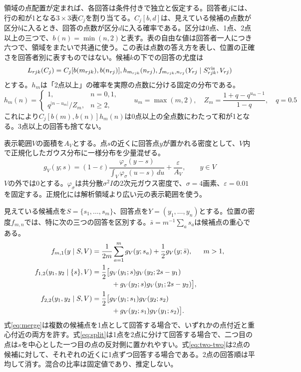 \documentclass[a4paper,11pt]{article}
\begin{document}
領域の点配置が定まれば、各回答は条件付きで独立と仮定する。回答者$j$には、行の和が1となる$3\times3$表$C_j$を割り当てる。$C_j[b,d]$は、見えている候補の点数が区分$b$に入るとき、回答の点数が区分$d$に入る確率である。区分は0点、1点、2点以上の三つで、$b(n)=\min(n,2)$と表す。表の自由な値は回答者一人につき六つで、領域をまたいで共通に使う。この表は点数の答え方を表し、位置の正確さを回答者別に表すものではない。候補$k$の下での回答の尤度は
\begin{equation}
 L_{rjk}(C_j)
 =C_j[b(m_{rjk}),b(n_{rj})],h_{m_{rjk}}(n_{rj}),
 f_{m_{rjk},n_{rj}}(Y_{rj}\mid S_{rjk}^{\rm vis},V_{rj})
 \label{eq:likelihood}
\end{equation}
とする。$h_m$は「2点以上」の確率を実際の点数に分ける固定の分布である。
\begin{equation}
 h_m(n)=
 \begin{cases}
  1,&n=0,1,\\
  q^{|n-u_m|}/Z_m,&n\geq2,
 \end{cases}
 \qquad u_m=\max(m,2),\quad
 Z_m=\frac{1+q-q^{u_m-1}}{1-q},\quad q=0.5
 \label{eq:tail}
\end{equation}
これにより$C_j[b(m),b(n)]h_m(n)$は0点以上の全点数にわたって和が1となる。3点以上の回答も捨てない。

表示範囲$V$の面積を$A_V$とする。点$s$の近くに回答点$y$が置かれる密度として、$V$内で正規化したガウス分布に一様分布を少量混ぜる。
\begin{equation}
 g_V(y;s)=(1-\varepsilon)
 \frac{\varphi_\sigma(y-s)}{\int_V\varphi_\sigma(u-s)\,du}
 +\frac{\varepsilon}{A_V},\qquad y\in V
 \label{eq:kernel}
\end{equation}
$V$の外では0とする。$\varphi_\sigma$は共分散$\sigma^2 I$の2次元ガウス密度で、$\sigma=4$画素、$\varepsilon=0.01$を固定する。正規化には解析領域より広い元の表示範囲を使う。

見えている候補点を$S=\{s_1,\ldots,s_m\}$、回答点を$Y=(y_1,\ldots,y_n)$とする。位置の密度$f_{m,n}$では、特に次の三つの回答を区別する。$\bar s=m^{-1}\sum_a s_a$は候補点の重心である。
\begin{align}
 f_{m,1}(y\mid S,V)
 &=\frac{1}{2m}\sum_{a=1}^m g_V(y;s_a)
   +\frac12 g_V(y;\bar s), &&m>1,
 \label{eq:merge}\\
 f_{1,2}(y_1,y_2\mid\{s\},V)
 &=\frac12\bigl[g_V(y_1;s)g_V(y_2;2s-y_1)
 \notag\\[-2pt]
 &\hspace{2.8em}+g_V(y_2;s)g_V(y_1;2s-y_2)\bigr],
 \label{eq:split}\\
 f_{2,2}(y_1,y_2\mid S,V)
 &=\frac12\bigl[g_V(y_1;s_1)g_V(y_2;s_2)
 \notag\\[-2pt]
 &\hspace{2.8em}+g_V(y_2;s_1)g_V(y_1;s_2)\bigr].
 \label{eq:two-two}
\end{align}
式\eqref{eq:merge}は複数の候補点を1点として回答する場合で、いずれかの点付近と重心付近の両方を許す。式\eqref{eq:split}は1点を2点に分けて回答する場合で、二つ目の点は$s$を中心とした一つ目の点の反対側に置かれやすい。式\eqref{eq:two-two}は2点の候補に対して、それぞれの近くに1点ずつ回答する場合である。2点の回答順は平均して消す。混合の比率は固定値であり、推定しない。
\end{document}
